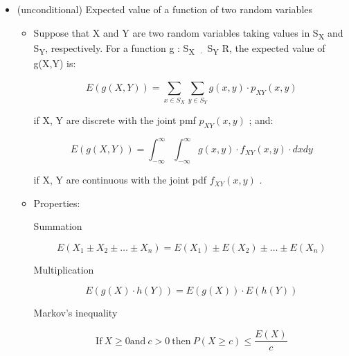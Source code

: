 \documentclass[12pt]{report}
\renewcommand{\_}{\kern-1.5pt\textunderscore\kern-1.5pt}
\begin{document}
\begin{itemize}
	\item (unconditional) Expected value of a function of two random variables\par

\begin{itemize}
	\item Suppose that X and Y are two random variables taking values in S\textsubscript{X} and S\textsubscript{Y}, respectively. For a function g : S\textsubscript{X \( ~ \cdot   \) }S\textsubscript{Y}  R, the expected value of g(X,Y) is:\par

 \[ E \left( g \left( X,Y \right)  \right) = \sum _{x \in S_{X}}^{} \sum _{y \in S_{Y}}^{}g \left( x,y \right)  \cdot p_{XY} \left( x,y \right)  \] \par

if X, Y are discrete with the joint pmf  \( p_{XY} \left( x,y \right)  \) ; and:\par

 \[ E \left( g \left( X,Y \right)  \right) = \int _{-\infty}^{\infty} \int _{-\infty}^{\infty}g \left( x,y \right)  \cdot f_{XY} \left( x,y \right)  \cdot dxdy \] \par

if X, Y are continuous with the joint pdf  \( f_{XY} \left( x,y \right)  \) .\par

	\item Properties:\par

Summation\par

 \[ E \left( X_{1} \pm X_{2} \pm  \ldots  \pm X_{n} \right) =E \left( X_{1} \right)  \pm E \left( X_{2} \right)  \pm  \ldots  \pm E \left( X_{n} \right)  \] \par

Multiplication\par

 \[ E \left( g \left( X \right)  \cdot h \left( Y \right)  \right) =E \left( g \left( X \right)  \right)  \cdot E \left( h \left( Y \right)  \right)  \] \par

Markov’s inequality\par

 \[ \mathrm{If~}X \geq 0 \mathrm{and~}c>0\mathrm{~then~}P \left( X \geq c \right)  \leq \frac{E \left( X \right) }{c} \] \par



\end{itemize}
\end{itemize}
\end{document}
